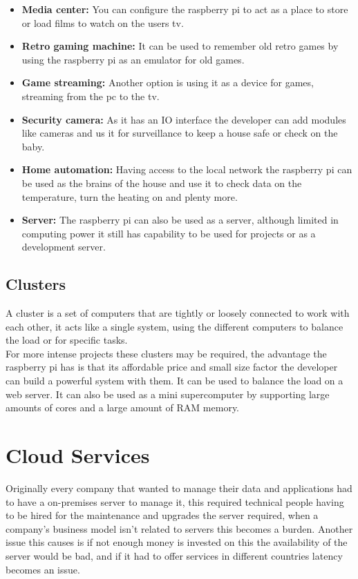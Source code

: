 \begin{itemize}
	\item {\textbf{Media center:} You can configure the raspberry pi to act as a place to store or load films to watch on the users tv.}
	\item {\textbf{Retro gaming machine:} It can be used to remember old retro games by using the raspberry pi as an emulator for old games.}
	\item {\textbf{Game streaming:} Another option is using it as a device for games, streaming from the pc to the tv.}
	\item {\textbf{Security camera:} As it has an IO interface the developer can add modules like cameras and us it for surveillance to keep a house safe or check on the baby.}
	\item {\textbf{Home automation:} Having access to the local network the raspberry pi can be used as the brains of the house and use it to check data on the temperature, turn the heating on and plenty more.}
	\item {\textbf{Server:} The raspberry pi can also be used as a server, although limited in computing power it still has capability to be used for projects or as a development server.}
\end{itemize}

\subsection{Clusters}\label{sec:chap3_clusters}
A cluster is a set of computers that are tightly or loosely connected to work with each other, it acts like a single system, using the different computers to balance the load or for specific tasks.\\
For more intense projects these clusters may be required, the advantage the raspberry pi has is that its affordable price and small size factor the developer can build a powerful system with them. It can be used to balance the load on a web server. It can also be used as a mini supercomputer by supporting large amounts of cores and a large amount of RAM memory.

\section{Cloud Services}\label{sec:chap3_cloud}

Originally every company that wanted to manage their data and applications had to have a on-premises server to manage it, this required technical people having to be hired for the maintenance and upgrades the server required, when a company’s business model isn’t related to servers this becomes a burden. Another issue this causes is if not enough money is invested on this the availability of the server would be bad, and if it had to offer services in different countries latency becomes an issue.\\

